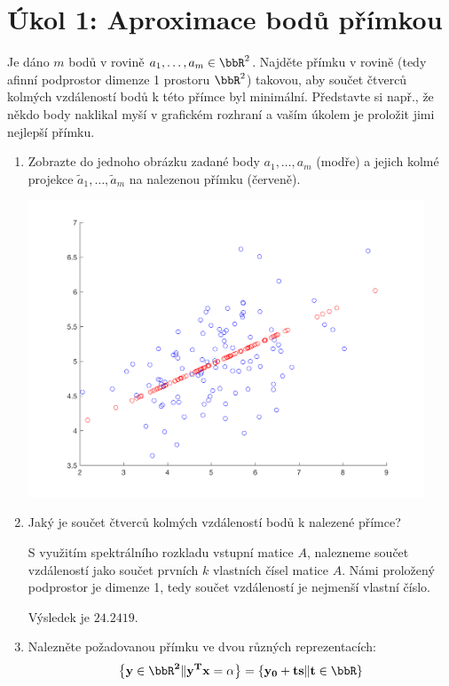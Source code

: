\section{Úkol 1: Aproximace bodů přímkou}

Je dáno \( m \) bodů v rovině \( a_1, \dots, a_m \in \bbR^2 \). Najděte přímku v rovině (tedy afinní podprostor dimenze 1 prostoru \( \bbR^2 \)) takovou, aby součet čtverců kolmých vzdáleností bodů k této přímce byl minimální. Představte si např., že někdo body naklikal myší v grafickém rozhraní a vaším úkolem je proložit jimi nejlepší přímku.

\begin{enumerate}
    \item Zobrazte do jednoho obrázku zadané body \( a_1, \dots, a_m \) (modře) a jejich kolmé projekce \( \tilde{a}_1, \dots, \tilde{a}_m \) na nalezenou přímku (červeně).

    \begin{center}
        \includegraphics[width=0.93\textwidth]{../prolozeni-primkou.png}
    \end{center}

    \item Jaký je součet čtverců kolmých vzdáleností bodů k nalezené přímce?

    S využitím spektrálního rozkladu vstupní matice \( A \), nalezneme součet vzdáleností jako součet prvních \( k \) vlastních čísel matice \( A \). Námi proložený podprostor je dimenze 1, tedy součet vzdáleností je nejmenší vlastní číslo.
    
    Výsledek je \( 24.2419 \).

    \item Nalezněte požadovanou přímku ve dvou různých reprezentacích:
    \[ \left\{ \bf{y} \in \bbR^2 \| \bf{y}^T \bf{x} = \alpha \right\} = \left\{ \bf{y}_0 + t \bf{s} \| t \in \bbR \right\} \]


\end{enumerate}
